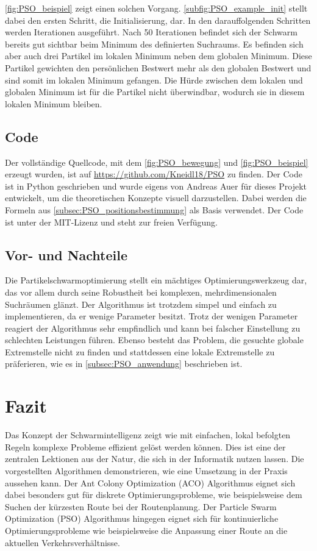 \documentclass[pdftex,
               12pt,
               DIV=12,
               a4paper,
               twoside,
               parskip=half,
               abstract=true,
               dvipsnames]{scrartcl}
\begin{document}
\cref{fig:PSO_beispiel} zeigt einen solchen Vorgang. \cref{subfig:PSO_example_init} stellt dabei den ersten Schritt, die Initialisierung, dar. In den darauffolgenden Schritten  werden Iterationen ausgef\"uhrt. Nach 50 Iterationen befindet sich der Schwarm bereits gut sichtbar beim Minimum des definierten Suchraums. Es befinden sich aber auch drei Partikel im lokalen Minimum neben dem globalen Minimum. Diese Partikel gewichten den pers\"onlichen Bestwert mehr als den globalen Bestwert und sind somit im lokalen Minimum \glqq gefangen\grqq. Die H\"urde zwischen dem lokalen und globalen Minimum ist f\"ur die Partikel nicht \"uberwindbar, wodurch sie in diesem lokalen Minimum bleiben.


\subsection{Code}
Der vollst\"andige Quellcode, mit dem \cref{fig:PSO_bewegung} und \cref{fig:PSO_beispiel} erzeugt wurden, ist auf \url{https://github.com/Kneidl18/PSO} zu finden. Der Code ist in Python geschrieben und wurde eigens von Andreas Auer f\"ur dieses Projekt entwickelt, um die theoretischen Konzepte visuell darzustellen. Dabei werden die Formeln aus \cref{subsec:PSO_positionsbestimmung} als Basis verwendet. Der Code ist unter der MIT-Lizenz und steht zur freien Verf\"ugung.


\subsection{Vor- und Nachteile}
\label{subsec:PSO_vor_nachteile}
Die Partikelschwarmoptimierung stellt ein m\"achtiges Optimierungswerkzeug dar, das vor allem durch seine Robustheit bei komplexen, mehrdimensionalen Suchr\"aumen gl\"anzt. Der Algorithmus ist trotzdem simpel und einfach zu implementieren, da er wenige Parameter besitzt. Trotz der wenigen Parameter reagiert der Algorithmus sehr empfindlich und kann bei falscher Einstellung zu schlechten Leistungen f\"uhren. Ebenso besteht das Problem, die gesuchte globale Extremstelle nicht zu finden und stattdessen eine lokale Extremstelle zu pr\"aferieren, wie es in \cref{subsec:PSO_anwendung} beschrieben ist.


\section{Fazit}
Das Konzept der Schwarmintelligenz zeigt wie mit einfachen, lokal befolgten Regeln komplexe Probleme effizient gel\"ost werden k\"onnen. Dies ist eine der zentralen Lektionen aus der Natur, die sich in der Informatik nutzen lassen. Die vorgestellten Algorithmen demonstrieren, wie eine Umsetzung in der Praxis aussehen kann. Der Ant Colony Optimization (ACO) Algorithmus eignet sich dabei besonders gut f\"ur diskrete Optimierungsprobleme, wie beispielsweise dem Suchen der k\"urzesten Route bei der Routenplanung. Der Particle Swarm Optimization (PSO) Algorithmus hingegen eignet sich f\"ur kontinuierliche Optimierungsprobleme wie beispielsweise die Anpassung einer Route an die aktuellen Verkehrsverh\"altnisse.

\listoffigures



\end{document}
